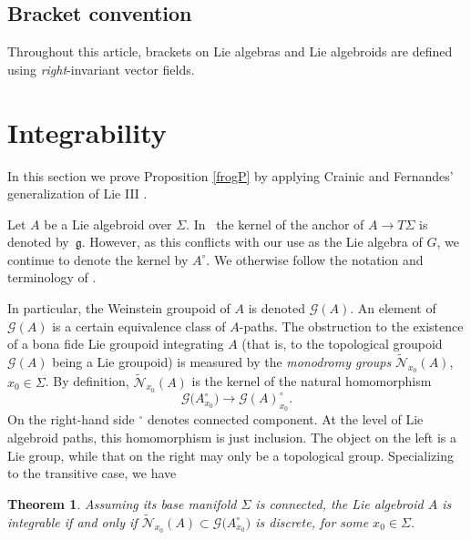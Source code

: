 \documentclass[10pt,a4paper]{amsart}
\numberwithin{equation}{section}
\newtheorem{Theorem}{Theorem}[section]
\begin{document}
\subsection*{Bracket convention}
Throughout this article, brackets on
Lie algebras and Lie algebroids are defined using {\em
right}-invariant vector fields.

\section{Integrability}
\label{newsec}

In this section we prove Proposition \ref{frogP} by applying Crainic
and Fernandes' generalization of Lie III \cite{Crainic_Fernandes_03}.

Let $A$ be a Lie algebroid over $\Sigma$. In~\cite{Crainic_Fernandes_03, Crainic_Fernandes_11} the kernel of the
anchor of $A \rightarrow T \Sigma$ is denoted by~${\mathfrak g}
$. However, as this conflicts with our use as the Lie algebra of $G$,
we continue to denote the kernel by $A^\circ$. We otherwise follow the
notation and terminology of \cite{Crainic_Fernandes_11}.

In particular, the Weinstein groupoid of $A$ is denoted ${\mathcal
G}(A)$. An element of ${\mathcal G}(A)$ is a certain equivalence class
of $A$-paths. The obstruction to the existence of a bona fide Lie
groupoid integrating $A$ (that is, to the topological groupoid
${\mathcal G}(A)$ being a Lie groupoid) is measured by the {\it monodromy groups} $\tilde {\mathcal N}_{x_0}(A) $, $x_0 \in \Sigma
$. By definition, $\tilde {\mathcal N}_{x_0}(A) $ is the kernel of the
natural homomorphism
\begin{equation}
{\mathcal G}\big(A^\circ_{x_0}\big)\rightarrow {\mathcal G}(A)^\circ_{x_0} \label{dqp}.
\end{equation} On the right-hand side ${}^\circ$ denotes connected
component. At the level of Lie algebroid paths, this homomorphism is
just inclusion. The object on the left is a Lie group, while that on
the right may only be a topological group. Specializing
\cite{Crainic_Fernandes_03} to the transitive case, we have

\begin{Theorem}%
 Assuming its base manifold $\Sigma $ is connected, the Lie algebroid
 $A$ is integrable if and only if
 $\tilde {\mathcal N}_{x_0}(A) \subset {\mathcal G}\big(A^\circ_{x_0}\big)$
 is discrete, for some $x_0 \in \Sigma $.
\end{Theorem}
\end{document}

